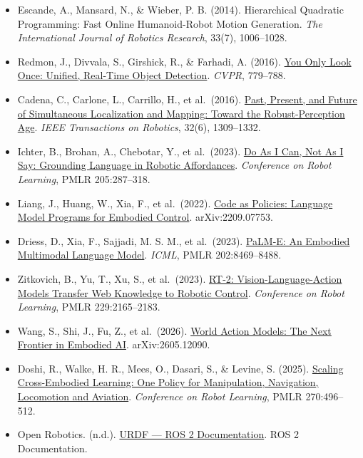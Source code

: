 \begin{itemize}
\item
  Escande, A., Mansard, N., \& Wieber, P. B. (2014). Hierarchical Quadratic Programming: Fast Online Humanoid-Robot Motion Generation. \emph{The International Journal of Robotics Research}, 33(7), 1006--1028.
\item
  Redmon, J., Divvala, S., Girshick, R., \& Farhadi, A. (2016). \href{https://openaccess.thecvf.com/content_cvpr_2016/html/Redmon_You_Only_Look_CVPR_2016_paper.html}{You Only Look Once: Unified, Real-Time Object Detection}. \emph{CVPR}, 779--788.
\item
  Cadena, C., Carlone, L., Carrillo, H., et al.~(2016). \href{https://arxiv.org/abs/1606.05830}{Past, Present, and Future of Simultaneous Localization and Mapping: Toward the Robust-Perception Age}. \emph{IEEE Transactions on Robotics}, 32(6), 1309--1332.
\item
  Ichter, B., Brohan, A., Chebotar, Y., et al.~(2023). \href{https://proceedings.mlr.press/v205/ichter23a.html}{Do As I Can, Not As I Say: Grounding Language in Robotic Affordances}. \emph{Conference on Robot Learning}, PMLR 205:287--318.
\item
  Liang, J., Huang, W., Xia, F., et al.~(2022). \href{https://arxiv.org/abs/2209.07753}{Code as Policies: Language Model Programs for Embodied Control}. arXiv:2209.07753.
\item
  Driess, D., Xia, F., Sajjadi, M. S. M., et al.~(2023). \href{https://proceedings.mlr.press/v202/driess23a.html}{PaLM-E: An Embodied Multimodal Language Model}. \emph{ICML}, PMLR 202:8469--8488.
\item
  Zitkovich, B., Yu, T., Xu, S., et al.~(2023). \href{https://proceedings.mlr.press/v229/zitkovich23a.html}{RT-2: Vision-Language-Action Models Transfer Web Knowledge to Robotic Control}. \emph{Conference on Robot Learning}, PMLR 229:2165--2183.
\item
  Wang, S., Shi, J., Fu, Z., et al.~(2026). \href{https://arxiv.org/abs/2605.12090}{World Action Models: The Next Frontier in Embodied AI}. arXiv:2605.12090.
\item
  Doshi, R., Walke, H. R., Mees, O., Dasari, S., \& Levine, S. (2025). \href{https://proceedings.mlr.press/v270/doshi25a.html}{Scaling Cross-Embodied Learning: One Policy for Manipulation, Navigation, Locomotion and Aviation}. \emph{Conference on Robot Learning}, PMLR 270:496--512.
\item
  Open Robotics. (n.d.). \href{https://docs.ros.org/en/rolling/Tutorials/Intermediate/URDF/URDF-Main.html}{URDF --- ROS 2 Documentation}. ROS 2 Documentation.

\end{itemize}
